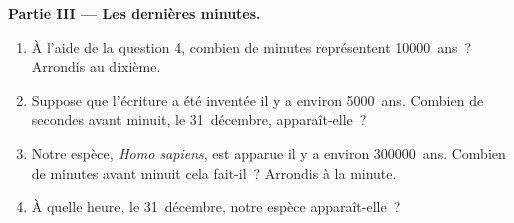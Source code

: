 \begin{problem}
\medskip
\noindent\textbf{Partie III --- Les dernières minutes.}\par\nopagebreak
\begin{enumerate}[resume, beginpenalty=10000]
  \item À l'aide de la question 4, combien de minutes représentent
        \num{10000}~ans~? Arrondis au dixième.
  \item Suppose que l'écriture a été inventée il y a environ \num{5000}~ans.
        Combien de secondes avant minuit, le 31~décembre, apparaît-elle~?
  \item Notre espèce, \emph{Homo sapiens}, est apparue il y a environ
        \num{300000}~ans. Combien de minutes avant minuit cela fait-il~?
        Arrondis à la minute.
  \item À quelle heure, le 31~décembre, notre espèce apparaît-elle~?
\end{enumerate}
\end{problem}
